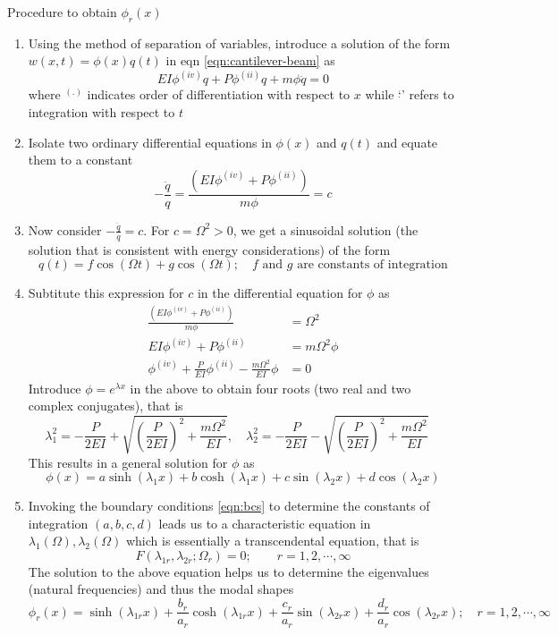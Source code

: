 \begin{mdframed}
	Procedure to obtain $\phi_r (x)$ \cite{meirovitch}
	\begin{enumerate}
		\item Using the method of separation of variables, introduce a solution of the form $w(x,t) = \phi (x)q(t)$ in eqn \ref{eqn:cantilever-beam} as
		$$EI\phi^{(iv)}q + P\phi^{(ii)}q + m\phi\ddot{q} = 0$$
		where $^{(.)}$ indicates order of differentiation with respect to $x$ while `$\dot{}$' refers to integration with respect to $t$
		\item Isolate two ordinary differential equations in $\phi (x)$ and $q(t)$ and equate them to a constant
		$$-\frac{\ddot{q}}{q} = \frac{(EI\phi^{(iv)} + P\phi^{(ii)})}{m\phi} = c$$
		\item Now consider $-\frac{\ddot{q}}{q} = c$. For $c = \Omega^2>0$, we get a sinusoidal solution (the solution that is consistent with energy considerations) of the form 
		$$q(t) = f\cos(\Omega t) + g \cos(\Omega t); \quad \text{$f$ and $g$ are constants of integration}$$
		\item Subtitute this expression for $c$ in the differential equation for $\phi$ as
		\begin{align*}
		\frac{(EI\phi^{(iv)} + P\phi^{(ii)})}{m\phi} &= \Omega^2 \\
		EI\phi^{(iv)} + P\phi^{(ii)} &= m\Omega^2 \phi \\
		\phi^{(iv)} + \frac{P}{EI}\phi^{(ii)} - \frac{m\Omega^2}{EI}\phi &= 0
		\end{align*}
		Introduce $\phi = e^{\lambda x}$ in the above to obtain four roots (two real and two complex conjugates), that is
		$$\lambda_{1}^2 = -\frac{P}{2EI} + \sqrt{\left( \frac{P}{2EI}\right)^2 + \frac{m\Omega^2}{EI}},\quad \lambda_{2}^2 = -\frac{P}{2EI} - \sqrt{\left( \frac{P}{2EI}\right)^2 + \frac{m\Omega^2}{EI}}\quad $$
		This results in a general solution for $\phi$ as
		$$\phi(x) = a\sinh(\lambda_1 x) + b\cosh(\lambda_1 x) + c\sin(\lambda_2 x) + d\cos(\lambda_2 x)$$ 
		\item Invoking the boundary conditions \ref{eqn:bcs} to determine the constants of integration $(a,b,c,d)$ leads us to a characteristic equation in $\lambda_1 (\Omega), \lambda_2 (\Omega)$ which is essentially a transcendental equation, that is
		$$F(\lambda_{1r}, \lambda_{2r}; \Omega_r) = 0; \qquad r=1,2,\cdots,\infty$$
		The solution to the above equation helps us to determine the eigenvalues (natural frequencies) and thus the modal shapes
		$$\phi_r (x) = \sinh(\lambda_{1r} x) + \frac{b_r}{a_r}\cosh(\lambda_{1r} x) + \frac{c_r}{a_r}\sin(\lambda_{2r} x) + \frac{d_r}{a_r}\cos(\lambda_{2r} x); \quad r=1,2,\cdots,\infty$$
	\end{enumerate}
\end{mdframed}


